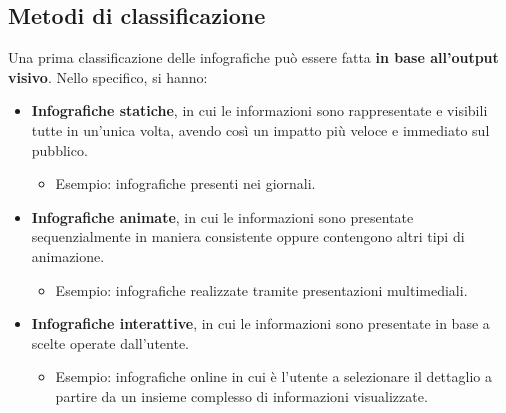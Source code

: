 \subsection{Metodi di classificazione}\label{subsec:info_classifica}
Una prima classificazione delle infografiche può essere fatta \textbf{in base all'output visivo}. Nello specifico, si hanno:
\begin{itemize}
    \item \textbf{Infografiche statiche}, in cui le informazioni sono rappresentate e visibili tutte in un'unica volta, avendo così un impatto più
    veloce e immediato sul pubblico.
    \begin{itemize}
        \item Esempio: infografiche presenti nei giornali.
    \end{itemize}
    \item \textbf{Infografiche animate}, in cui le informazioni sono presentate sequenzialmente in maniera consistente oppure contengono altri tipi di animazione.
    \begin{itemize}
        \item Esempio: infografiche realizzate tramite presentazioni multimediali.
    \end{itemize}
    \item \textbf{Infografiche interattive}, in cui le informazioni sono presentate in base a scelte operate dall'utente.
    \begin{itemize}
        \item Esempio: infografiche online in cui è l'utente a selezionare il dettaglio a partire da un insieme complesso di informazioni visualizzate.
    \end{itemize}
\end{itemize}


